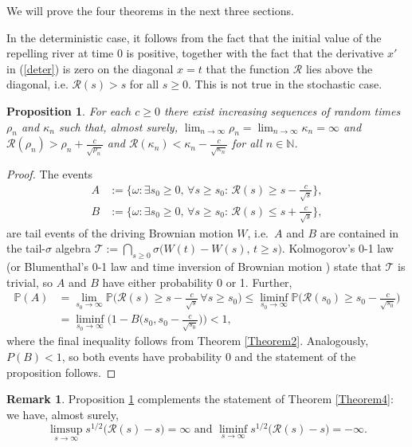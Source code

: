 \documentclass[sn-mathphys-num]{sn-jnl}
\newtheorem{prp}[thm]{Proposition}
\theoremstyle{definition}
\newtheorem{rem}[thm]{Remark}
\newcommand{\scr}[1]{\mathscr #1}
\numberwithin{equation}{section} \theoremstyle{remark}
\def\N{\mathbb N} \def\kk{\kappa} \def\m{{\bf m}}
\def\RR{\mathscr R}
\def\P{\mathbb P}
\newcommand{\1}{\mathbbm{1}}
\begin{document}

  We will prove the four theorems in the next  three sections.

  In the deterministic case, it follows from the fact that the initial
  value of the repelling river at time 0 is positive, together with
  the fact that the derivative $x'$ in (\ref{deter}) is zero on the
  diagonal $x=t$ that the function $\scr{R}$ lies above the diagonal,
  i.e. $\scr{R}(s)>s$ for all $s \geq 0$. This is not true in the
  stochastic case.
  \begin{prp}\label{osc}
    For each $c\geq 0$ there exist increasing sequences of random times $\rho_n$ and $\kappa_n$ such that, almost surely, $\lim_{n \to \infty}\rho_n=\lim_{n \to \infty}\kappa_n=\infty$ and
    $\scr{R}(\rho_n)>\rho_n+\frac c{\sqrt{\rho_n}}$ and
    $\scr{R}(\kappa_n)<\kappa_n - \frac c{\sqrt{\kappa_n}} $ for all $n \in \N$. 
   \end{prp}

   \begin{proof}
     The events
     \begin{align*}
       A&:=\{\omega:\exists s_0\geq 0,\,\forall s \geq s_0:\, \scr{R}(s)\geq s-\frac c{\sqrt{s}}\},\\
       B&:=\{\omega:\exists s_0\geq 0,\,\forall s \geq s_0:\, \scr{R}(s)\leq s+\frac c{\sqrt{s}}\},
     \end{align*}
     are tail events of the driving Brownian motion $W$, i.e.~$A$ and $B$ are contained in the tail-$\sigma$ algebra $\scr{T}:=\bigcap_{s\geq 0}\sigma\big(W(t)-W(s),\,t \geq s\big)$.
     Kolmogorov's 0-1 law (or Blumenthal's 0-1 law \cite[Theorem 2.7.17]{KS} and time inversion of Brownian motion \cite[Lemma 2.9.4(ii)]{KS}) state that $\scr{T}$ is trivial, so $A$ and $B$ have either probability 0 or 1. Further,
     \begin{align*}
       \P(A)&=\lim_{s_0\to \infty}\P\Big(\RR(s)\geq s-\frac c{\sqrt{s}}\,\forall s\geq s_0 \Big)\leq\liminf_{s_0\to \infty} \P\Big(\RR(s_0)\geq s_0-\frac c{\sqrt{s_0}}\Big)\\
       &=\liminf_{s_0\to \infty}\Big(1-B\Big(s_0,s_0-\frac c{\sqrt{s_0}}\Big)\Big)<1,
     \end{align*}
     where the final inequality follows from Theorem \ref{Theorem2}. Analogously, $P(B)<1$, so 
     both events have probability 0 and the statement of the proposition follows.
   \end{proof}

   \begin{rem}\label{inft}
     Proposition \ref{osc} complements the statement of Theorem \ref{Theorem4}: we have, almost surely,
     $$
\limsup_{s \to \infty} s^{1/2}\big(\RR(s)-s\big)=\infty \mbox{ and } \liminf_{s \to \infty} s^{1/2}\big(\RR(s)-s\big)=-\infty. 
     $$
     \end{rem}
   
\end{document}
